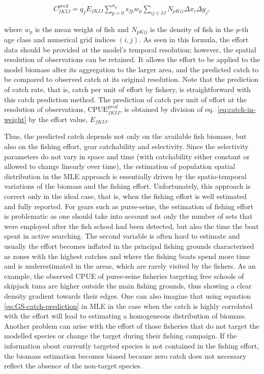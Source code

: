 \begin{align}
C^{pred}_{fKIJ}=q_f E_{fKIJ} \sum\limits^{n_a}_{p=0} s_{fp} w_p \sum\limits_{ij \in IJ} N_{pKij} {\scriptstyle\Delta} x_i \mathit{\scriptstyle\Delta} y_j,
\label{eq:catch-in-weight}
\end{align}

\noindent where $w_p$ is the mean weight of fish and $N_{pKij}$ is the density of fish in the $p$-th age class and numerical grid indices $(i,j)$. As seen in this formula, the effort data should be provided at the model's temporal resolution; however, the spatial resolution of observations can be retained. It allows the effort to be applied to the model biomass after its aggregation to the larger area, and the predicted catch to be compared to observed catch at its original resolution. Note that the prediction of catch rate, that is, catch per unit of effort by fishery, is straightforward with this catch prediction method. The prediction of catch per unit of effort at the resolution of observations, $\text{CPUE}^{pred}_{fKIJ}$, is obtained by division of  eq.~\ref{eq:catch-in-weight} by the effort value, $E_{fKIJ}$. 

Thus, the predicted catch depends not only on the available fish biomass, but also on the fishing effort, gear catchability and selectivity. Since the selectivity parameters do not vary in space and time (with catchability either constant or allowed to change linearly over time), the estimation of population spatial distribution in the MLE approach is essentially driven by the spatio-temporal variations of the biomass and the fishing effort. Unfortunately, this approach is correct only in the ideal case, that is, when the fishing effort is well estimated and fully reported. For gears such as purse-seine, the estimation of fishing effort is problematic as one should take into account not only the number of sets that were employed after the fish school had been detected, but also the time the boat spent in active searching. The second variable is often hard to estimate and usually the effort becomes inflated in the principal fishing grounds characterised as zones with the highest catches and where the fishing boats spend more time and is underestimated in the areas, which are rarely visited by the fishers. As an example, the observed CPUE of purse-seine fisheries targeting free schools of skipjack tuna are higher outside the main fishing grounds, thus showing a clear density gradient towards their edges. One can also imagine that using equation \ref{eq:GS-catch-prediction} in MLE in the case when the catch is highly correlated with the effort will lead to estimating a homogeneous distribution of biomass. Another problem can arise with the effort of those fisheries that do not target the modelled species or change the target during their fishing campaign. If the information about currently targeted species is not contained in the fishing effort, the biomass estimation becomes biased because zero catch does not necessary reflect the absence of the non-target species.

